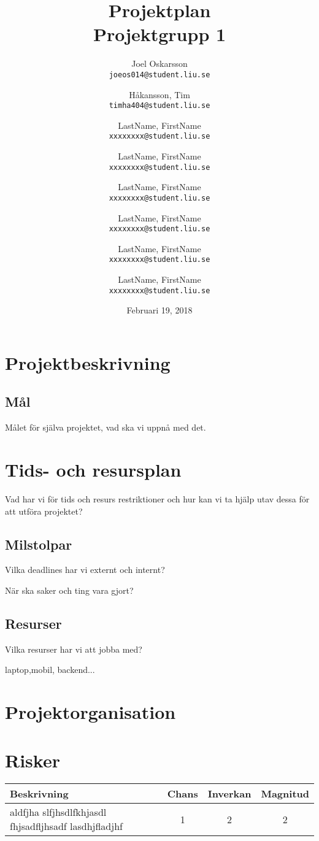 \documentclass[12pt]{article}
\title{Projektplan\\Projektgrupp 1}
\author{
	Joel Oskarsson\\
	\texttt{joeos014@student.liu.se}
	\and
    Håkansson, Tim\\
	\texttt{timha404@student.liu.se}
	\and
	LastName, FirstName\\
	\texttt{xxxxxxxx@student.liu.se}
	\and
	LastName, FirstName\\
	\texttt{xxxxxxxx@student.liu.se}
	\and
	LastName, FirstName\\
	\texttt{xxxxxxxx@student.liu.se}
  	\and
  	LastName, FirstName\\
	\texttt{xxxxxxxx@student.liu.se}
  	\and
  	LastName, FirstName\\
	\texttt{xxxxxxxx@student.liu.se}
  	\and
  	LastName, FirstName\\
	\texttt{xxxxxxxx@student.liu.se}
}
\date{Februari 19, 2018}
\begin{document}
\maketitle

\section{Projektbeskrivning}

\subsection{Mål}
Målet för själva projektet, vad ska vi uppnå med det.

\subsection{}

\section{Tids- och resursplan}
Vad har vi för tids och resurs restriktioner och hur kan vi ta hjälp utav dessa för att utföra 
projektet?

\subsection{Milstolpar}
Vilka deadlines har vi externt och internt?

När ska saker och ting vara gjort?
\subsection{Resurser}
Vilka resurser har vi att jobba med?

laptop,mobil, backend...


\section{Projektorganisation}
\section{Risker}

\begin{center}
    \begin{tabular}{| p{3cm} |  c | c |c | }
        \hline
        Beskrivning &  Chans &  Inverkan & Magnitud \\
        \hline
        \centering aldfjha slfjhsdlfkhjasdl fhjsadfljhsadf lasdhjfladjhf & 1 & 2 & 2\\
        \hline        
    \end{tabular}
\end{center}
\end{document}
